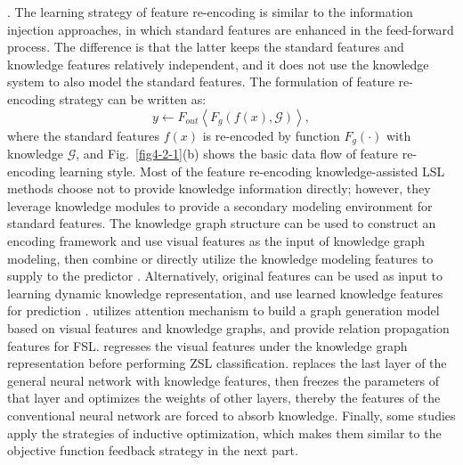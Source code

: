 \uppercase\expandafter{}. The learning strategy of feature re-encoding is similar to the information injection approaches, in which standard features are enhanced in the feed-forward process. The difference is that the latter keeps the standard features and knowledge features relatively independent, and it does not use the knowledge system to  also model the standard features. The formulation of feature re-encoding strategy can be written as:
\begin{equation}
\label{eq4-2-2}
y \leftarrow F_{out} \left\langle F_{g} ( f(x), \mathcal{G} ) \right\rangle,
\end{equation}
where the standard features $f(x)$ is re-encoded by function $F_{g}(\cdot)$ with knowledge $\mathcal{G}$, and Fig.~\ref{fig4-2-1}(b) shows the basic data flow of feature re-encoding learning style.
Most of the feature re-encoding knowledge-assisted LSL methods choose not to provide knowledge information directly; however, they leverage knowledge modules to provide a secondary modeling environment for standard features.  The knowledge graph structure can be used to construct an encoding framework and use visual features as the input of knowledge graph modeling, then combine or directly utilize the knowledge modeling features to supply to the predictor . Alternatively, original features can be used as input to learning dynamic knowledge representation, and use learned knowledge features for prediction .  utilizes attention mechanism to build a graph generation model based on visual features and knowledge graphs, and provide relation propagation features for FSL.   regresses the visual features under the knowledge graph representation before performing ZSL classification.   replaces the last layer of the general neural network with knowledge features, then freezes the parameters of that layer and optimizes the weights of other layers, thereby the features of the conventional neural network are forced to absorb knowledge. Finally, some studies apply the strategies of inductive optimization, which makes them  similar to the objective function feedback strategy in the next part.
